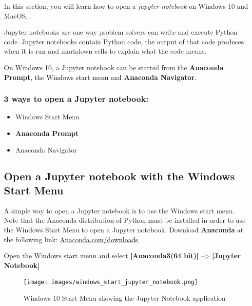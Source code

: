 \documentclass{book}
\begin{document}
    
        In this section, you will learn how to open a \emph{jupyter notebook} on
Windows 10 and MacOS.

Jupyter notebooks are one way problem solvers can write and execute
Python code. Jupyter notebooks contain Python code, the output of that
code produces when it is run and markdown cells to explain what the code
means.

On Windows 10, a Jupyter notebook can be started from the
\textbf{Anaconda Prompt}, the Windows start menu and \textbf{Anaconda
Navigator}.

\subsubsection{\texorpdfstring{3 ways to open a \textbf{Jupyter
notebook}:}{3 ways to open a Jupyter notebook:}}\label{ways-to-open-a-jupyter-notebook}

\begin{itemize}
\item
  Windows Start Menu
\item
  \textbf{Anaconda Prompt}
\item
  Anaconda Navigator
\end{itemize}
    




    
        \subsection{Open a Jupyter notebook with the Windows Start
Menu}\label{open-a-jupyter-notebook-with-the-windows-start-menu}
    




    
        A simple way to open a Jupyter notebook is to use the Windows start
menu. Note that the Anaconda distribution of Python must be installed in
order to use the Windows Start Menu to open a Jupyter notebook. Download
\textbf{Anaconda} at the following link:
\href{https://www.anaconda.com/download/}{Anaconda.com/downloads}

Open the Windows start menu and select \textbf{{[}Anaconda3(64 bit){]}}
--\textgreater{} \textbf{{[}Jupyter Notebook{]}}

\begin{figure}
\centering
\texttt{[image: images/windows\_start\_jupyter\_notebook.png]}
\caption{Windows 10 Start Menu showing the Jupyter Notebook application}
\end{figure}
\end{document}
